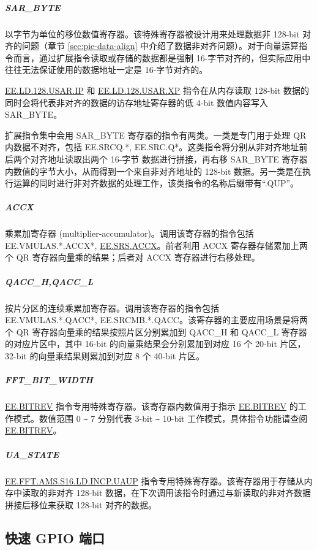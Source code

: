 \documentclass[main\_\_CN.tex]{subfiles}
\begin{document}
\subparagraph{SAR\_BYTE}

以字节为单位的移位数值寄存器。该特殊寄存器被设计用来处理数据非 128-bit 对齐的问题（章节 \ref{sec:pie-data-align} 中介绍了数据非对齐问题）。对于向量运算指令而言，通过扩展指令读取或存储的数据都是强制 16-字节对齐的，但实际应用中往往无法保证使用的数据地址一定是 16-字节对齐的。

\hyperref[instruction:EELD128USARIP]{EE.LD.128.USAR.IP} 和 \hyperref[instruction:EELD128USARXP]{EE.LD.128.USAR.XP} 指令在从内存读取 128-bit 数据的同时会将代表非对齐的数据的访存地址寄存器的低 4-bit 数值内容写入 SAR\_BYTE。

\chipname{} 扩展指令集中会用 SAR\_BYTE 寄存器的指令有两类。一类是专门用于处理 QR 内数据不对齐，包括 EE.SRCQ.*, EE.SRC.Q*。这类指令将分别从非对齐地址前后两个对齐地址读取出两个 16-字节 数据进行拼接，再右移 SAR\_BYTE 寄存器内数值的字节大小，从而得到一个来自非对齐地址的 128-bit 数据。另一类是在执行运算的同时进行非对齐数据的处理工作，该类指令的名称后缀带有“.QUP”。

\subparagraph{ACCX}

乘累加寄存器 (multiplier-accumulator)。调用该寄存器的指令包括 EE.VMULAS.*.ACCX*, \hyperref[instruction:EESRSACCX]{EE.SRS.ACCX}。前者利用 ACCX 寄存器存储累加上两个 QR 寄存器向量乘的结果；后者对 ACCX 寄存器进行右移处理。

\subparagraph{QACC\_H,QACC\_L}

按片分区的连续乘累加寄存器。调用该寄存器的指令包括 EE.VMULAS.*.QACC*, EE.SRCMB.*.QACC。该寄存器的主要应用场景是将两个 QR 寄存器向量乘的结果按照片区分别累加到 QACC\_H 和 QACC\_L 寄存器的对应片区中，其中 16-bit 的向量乘结果会分别累加到对应 16 个 20-bit 片区，32-bit 的向量乘结果则累加到对应 8 个 40-bit 片区。

\subparagraph{FFT\_BIT\_WIDTH}

\hyperref[instruction:EEBITREV]{EE.BITREV} 指令专用特殊寄存器。该寄存器内数值用于指示 \hyperref[instruction:EEBITREV]{EE.BITREV} 的工作模式。数值范围 0 \verb+~+ 7 分别代表 3-bit \verb+~+ 10-bit 工作模式，具体指令功能请查阅 \hyperref[instruction:EEBITREV]{EE.BITREV}。

\subparagraph{UA\_STATE}

\hyperref[instruction:EEFFTAMSS16LDINCPUAUP]{EE.FFT.AMS.S16.LD.INCP.UAUP} 指令专用特殊寄存器。该寄存器用于存储从内存中读取的非对齐 128-bit 数据，在下次调用该指令时通过与新读取的非对齐数据拼接后移位来获取 128-bit 对齐的数据。

\subsection{快速 GPIO 端口}
\end{document}
